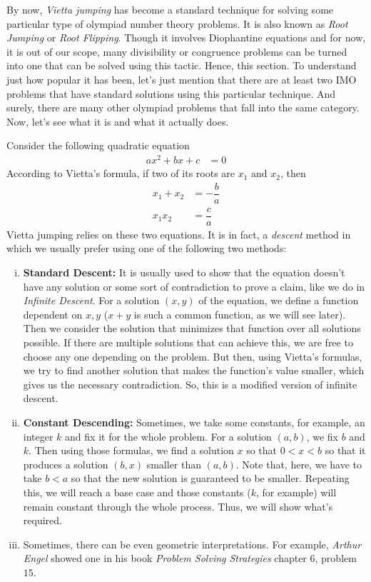By now, \textit{Vietta jumping} has become a standard technique for solving some particular type of olympiad number theory problems. It is also known as \textit{Root Jumping} or \textit{Root Flipping}. Though it involves Diophantine equations and for now, it is out of our scope, many divisibility or congruence problems can be turned into one that can be solved using this tactic. Hence, this section.
To understand just how popular it has been, let's just mention that there are at least two IMO problems that have standard solutions using this particular technique. And surely, there are many other olympiad problems that fall into the same category. Now, let's see what it is and what it actually does.

Consider the following quadratic equation
	\begin{align*}
	 	ax^2+bx+c & = 0
	\end{align*}
According to Vietta's formula, if two of its roots are $x_1$ and $x_2$, then
	\begin{align*}
		x_1+x_2 & = -\dfrac{b}{a}\\
		x_1x_2  & = \dfrac{c}{a}
	\end{align*}
Vietta jumping relies on these two equations. It is in fact, a \textit{descent} method in which we usually prefer using one of the following two methods:
	\begin{enumerate}[(i)]
		\item \textbf{Standard Descent:} It is usually used to show that the equation doesn't have any solution or some sort of contradiction to prove a claim, like we do in \textit{Infinite Descent}. For a solution $(x,y)$ of the equation, we define a function dependent on $x,y$ ($x+y$ is such a common function, as we will see later). Then we consider the solution that minimizes that function over all solutions possible. If there are multiple solutions that can achieve this, we are free to choose any one depending on the problem. But then, using Vietta's formulas, we try to find another solution that makes the function's value smaller, which gives us the necessary contradiction. So, this is a modified version of infinite descent.
		\item \textbf{Constant Descending:} Sometimes, we take some constants, for example, an integer $k$ and fix it for the whole problem. For a solution $(a,b)$, we fix $b$ and $k$. Then using those formulas, we find a solution $x$ so that $0<x<b$ so that it produces a solution $(b,x)$ smaller than $(a,b)$. Note that, here, we have to take $b<a$ so that the new solution is guaranteed to be smaller. Repeating this, we will reach a base case and those constants ($k$, for example) will remain constant through the whole process. Thus, we will show what's required.
		\item Sometimes, there can be even geometric interpretations. For example, \textit{Arthur Engel} showed one in his book \textit{Problem Solving Strategies} chapter $6$, problem $15$.
	\end{enumerate}
